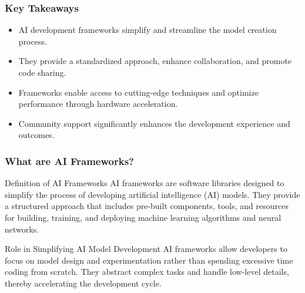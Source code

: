 \documentclass{beamer}
\begin{document}
\begin{frame}[fragile]
    \frametitle{Key Takeaways}
    \begin{itemize}
        \item AI development frameworks simplify and streamline the model creation process.
        \item They provide a standardized approach, enhance collaboration, and promote code sharing.
        \item Frameworks enable access to cutting-edge techniques and optimize performance through hardware acceleration.
        \item Community support significantly enhances the development experience and outcomes.
    \end{itemize}
\end{frame}

\begin{frame}[fragile]
    \frametitle{What are AI Frameworks?}
    \begin{block}{Definition of AI Frameworks}
        AI frameworks are software libraries designed to simplify the process of developing artificial intelligence (AI) models. They provide a structured approach that includes pre-built components, tools, and resources for building, training, and deploying machine learning algorithms and neural networks.
    \end{block}
    
    \begin{block}{Role in Simplifying AI Model Development}
        AI frameworks allow developers to focus on model design and experimentation rather than spending excessive time coding from scratch. They abstract complex tasks and handle low-level details, thereby accelerating the development cycle.
    \end{block}
\end{frame}
\end{document}

